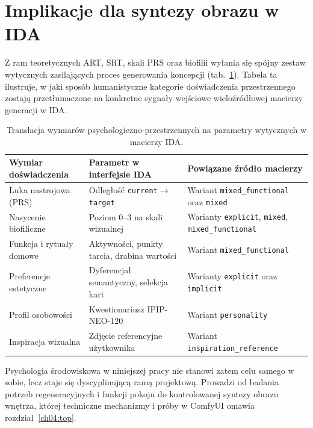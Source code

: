\section{Implikacje dla syntezy obrazu w IDA}
\label{ch02:sec:implikacje}

Z ram teoretycznych ART, SRT, skali PRS oraz biofilii wyłania się spójny zestaw wytycznych zasilających proces generowania koncepcji (tab.~\ref{tab:ch02:inputs-brief}).
Tabela ta ilustruje, w jaki sposób humanistyczne kategorie doświadczenia przestrzennego zostają przetłumaczone na konkretne sygnały wejściowe wieloźródłowej macierzy generacji w IDA.

\begin{table}[htbp]
  \centering
  \caption{Translacja wymiarów psychologiczno-przestrzennych na parametry wytycznych w macierzy IDA.}
  \label{tab:ch02:inputs-brief}
  \begin{tabular}{@{}p{}p{}p{}@{}}
    \toprule
    Wymiar doświadczenia & Parametr w interfejsie IDA & Powiązane źródło macierzy \\
    \midrule
    Luka nastrojowa (PRS)
      & Odległość \texttt{current}$\rightarrow$\texttt{target}
      & Wariant \texttt{mixed\_functional} oraz \texttt{mixed} \\
    Nasycenie biofiliczne
      & Poziom 0--3 na skali wizualnej
      & Warianty \texttt{explicit}, \texttt{mixed}, \texttt{mixed\_functional} \\
    Funkcja i rytuały domowe
      & Aktywności, punkty tarcia, drabina wartości
      & Wariant \texttt{mixed\_functional} \\
    Preferencje estetyczne
      & Dyferencjał semantyczny, selekcja kart
      & Warianty \texttt{explicit} oraz \texttt{implicit} \\
    Profil osobowości
      & Kwestionariusz IPIP-NEO-120
      & Wariant \texttt{personality} \\
    Inspiracja wizualna
      & Zdjęcie referencyjne użytkownika
      & Wariant \texttt{inspiration\_reference} \\
    \bottomrule
  \end{tabular}
\end{table}

Psychologia środowiskowa w niniejszej pracy nie stanowi zatem celu samego w sobie, lecz staje się dyscyplinującą ramą projektową. Prowadzi od badania potrzeb regeneracyjnych i funkcji pokoju do kontrolowanej syntezy obrazu wnętrza, której techniczne mechanizmy i próby w ComfyUI omawia rozdział~\ref{ch04:top}.
